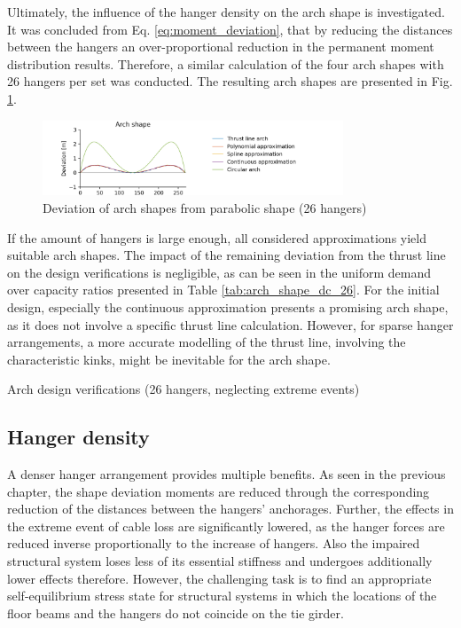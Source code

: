 Ultimately, the influence of the hanger density on the arch shape is investigated. It was concluded from Eq. \eqref{eq:moment_deviation}, that by reducing the distances between the hangers an over-proportional reduction in the permanent moment distribution results. Therefore, a similar calculation of the four arch shapes with 26 hangers per set was conducted. The resulting arch shapes are presented in Fig. \ref{fig:arch_shapes_26}.

\begin{figure}[H]
    \centering
    \includegraphics[trim={0 0 2cm 0},clip, width=0.8\textwidth]{calculations/arch shape/arch_shapes_26.png}
    \caption{Deviation of arch shapes from parabolic shape (26 hangers)}
    \label{fig:arch_shapes_26}
\end{figure}

If the amount of hangers is large enough, all considered approximations yield suitable arch shapes. The impact of the remaining deviation from the thrust line on the design verifications is negligible, as can be seen in the uniform demand over capacity ratios presented in Table \ref{tab:arch_shape_dc_26}. For the initial design, especially the continuous approximation presents a promising arch shape, as it does not involve a specific thrust line calculation. However, for sparse hanger arrangements, a more accurate modelling of the thrust line, involving the characteristic kinks, might be inevitable for the arch shape.

\begin{table}[H]
    \centering
    
    \caption{Arch design verifications (26 hangers, neglecting extreme events)}
    \label{tab:arch_shape_dc_26}
\end{table}


\newpage
\subsection{Hanger density}
A denser hanger arrangement provides multiple benefits. As seen in the previous chapter, the shape deviation moments are reduced through the corresponding reduction of the distances between the hangers' anchorages. Further, the effects in the extreme event of cable loss are significantly lowered, as the hanger forces are reduced inverse proportionally to the increase of hangers. Also the impaired structural system loses less of its essential stiffness and undergoes additionally lower effects therefore. However, the challenging task is to find an appropriate self-equilibrium stress state for structural systems in which the locations of the floor beams and the hangers do not coincide on the tie girder. \medskip

